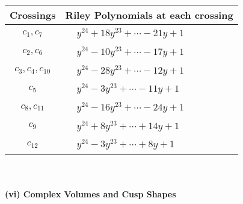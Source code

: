 \documentclass[1p]{elsarticle_modified}
\theoremstyle{definition}
\begin{document}
\begin{tabular}{m{50pt}|m{274pt}}
Crossings & \hspace{64pt}Riley Polynomials at each crossing \\
\hline $$\begin{aligned}c_{1},c_{7}\end{aligned}$$&$\begin{aligned}
&y^{24}+18 y^{23}+\cdots-21 y+1
\end{aligned}$\\
\hline $$\begin{aligned}c_{2},c_{6}\end{aligned}$$&$\begin{aligned}
&y^{24}-10 y^{23}+\cdots-17 y+1
\end{aligned}$\\
\hline $$\begin{aligned}c_{3},c_{4},c_{10}\end{aligned}$$&$\begin{aligned}
&y^{24}-28 y^{23}+\cdots-12 y+1
\end{aligned}$\\
\hline $$\begin{aligned}c_{5}\end{aligned}$$&$\begin{aligned}
&y^{24}-3 y^{23}+\cdots-11 y+1
\end{aligned}$\\
\hline $$\begin{aligned}c_{8},c_{11}\end{aligned}$$&$\begin{aligned}
&y^{24}-16 y^{23}+\cdots-24 y+1
\end{aligned}$\\
\hline $$\begin{aligned}c_{9}\end{aligned}$$&$\begin{aligned}
&y^{24}+8 y^{23}+\cdots+14 y+1
\end{aligned}$\\
\hline $$\begin{aligned}c_{12}\end{aligned}$$&$\begin{aligned}
&y^{24}-3 y^{23}+\cdots+8 y+1
\end{aligned}$\\
\hline
\end{tabular}\\~\\
\newpage\flushleft \textbf{(vi) Complex Volumes and Cusp Shapes}
\end{document}
